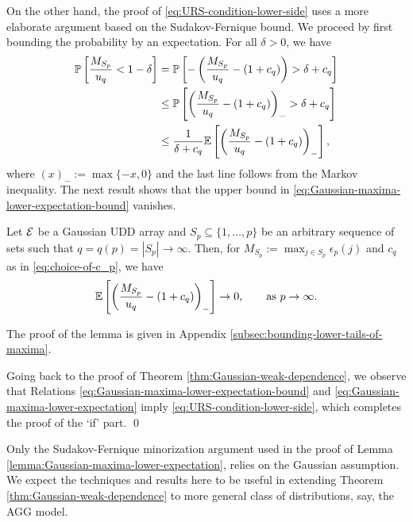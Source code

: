 On the other hand, the proof of \eqref{eq:URS-condition-lower-side} uses a more elaborate argument based on the Sudakov-Fernique bound.
We proceed by first bounding the probability by an expectation. 
For all $\delta>0$, we have
\begin{align}
    \P\left[\frac{M_{S_p}}{u_q}<1-\delta\right] 
        &= \P\left[-\left(\frac{M_{S_p}}{u_q} - (1+c_q)\right) > \delta + c_q\right] \nonumber \\
        &\le \P\left[\left(\frac{M_{S_p}}{u_q} - (1+c_q)\right)_->\delta+c_q\right] \nonumber \\
        &\le \frac{1}{\delta + c_q}\E\left[\left(\frac{M_{S_p}}{u_q} - (1+c_q)\right)_-\right], \label{eq:Gaussian-maxima-lower-expectation-bound}
\end{align}
where $(x)_-:=\max\{-x,0\}$ and the last line follows from the Markov inequality.
The next result shows that the upper bound in \eqref{eq:Gaussian-maxima-lower-expectation-bound} vanishes.
\begin{lemma} \label{lemma:Gaussian-maxima-lower-expectation}
  Let ${\cal E}$ be a Gaussian UDD  array  and 
  $S_p\subseteq\{1,\ldots,p\}$ be an arbitrary sequence of sets 
  such that $q = q(p) = |S_p|\to\infty$.  Then, for $M_{S_p}:= \max_{j\in S_p} \epsilon_p(j)$ and $c_q$ as in \eqref{eq:choice-of-c_p}, we have
  \begin{equation} \label{eq:Gaussian-maxima-lower-expectation}
    \E\left[\left(\frac{M_{S_p}}{u_q} - (1+c_q)\right)_-\right] \to 0,\ \ \quad \mbox{ as }p\to \infty.
  \end{equation}
\end{lemma}
The proof of the lemma is given in Appendix \ref{subsec:bounding-lower-tails-of-maxima}.


Going back to the proof of Theorem \ref{thm:Gaussian-weak-dependence}, we observe that Relations \eqref{eq:Gaussian-maxima-lower-expectation-bound} and \eqref{eq:Gaussian-maxima-lower-expectation} imply \eqref{eq:URS-condition-lower-side}, which completes the proof of the `if' part. \qed 

\begin{remark} Only the Sudakov-Fernique minorization argument used in the proof of Lemma \ref{lemma:Gaussian-maxima-lower-expectation}, relies on the Gaussian assumption. We expect the techniques and results here to be useful in extending Theorem \ref{thm:Gaussian-weak-dependence} to more general class of distributions, say, the AGG model.
\end{remark}

